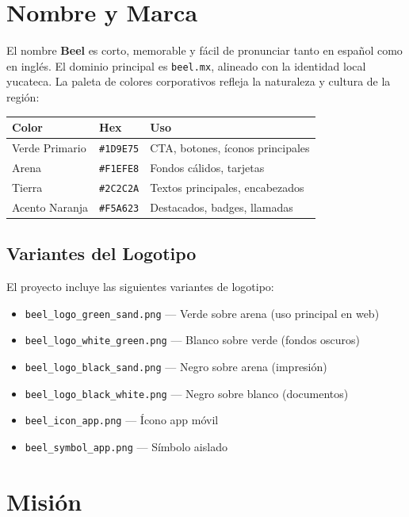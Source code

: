 \documentclass[12pt,a4paper]{report}
\begin{document}
\section{Nombre y Marca}

El nombre \textbf{Beel} es corto, memorable y f\'acil de pronunciar tanto en espa\~nol como
en ingl\'es. El dominio principal es \texttt{beel.mx}, alineado con la identidad local
yucateca. La paleta de colores corporativos refleja la naturaleza y cultura de la regi\'on:

\begin{center}
\begin{tabular}{L{4.5cm} C{2.5cm} L{4cm}}
\toprule
\textbf{Color} & \textbf{Hex} & \textbf{Uso} \\
\midrule
Verde Primario & \texttt{\#1D9E75} & CTA, botones, \'iconos principales \\
Arena & \texttt{\#F1EFE8} & Fondos c\'alidos, tarjetas \\
Tierra & \texttt{\#2C2C2A} & Textos principales, encabezados \\
Acento Naranja & \texttt{\#F5A623} & Destacados, badges, llamadas \\
\bottomrule
\end{tabular}
\end{center}

\subsection{Variantes del Logotipo}

El proyecto incluye las siguientes variantes de logotipo:
\begin{itemize}[leftmargin=*]
  \item \texttt{beel\_logo\_green\_sand.png} --- Verde sobre arena (uso principal en web)
  \item \texttt{beel\_logo\_white\_green.png} --- Blanco sobre verde (fondos oscuros)
  \item \texttt{beel\_logo\_black\_sand.png} --- Negro sobre arena (impresi\'on)
  \item \texttt{beel\_logo\_black\_white.png} --- Negro sobre blanco (documentos)
  \item \texttt{beel\_icon\_app.png} --- \'Icono app m\'ovil
  \item \texttt{beel\_symbol\_app.png} --- S\'imbolo aislado
\end{itemize}

\section{Misi\'on}
\end{document}
